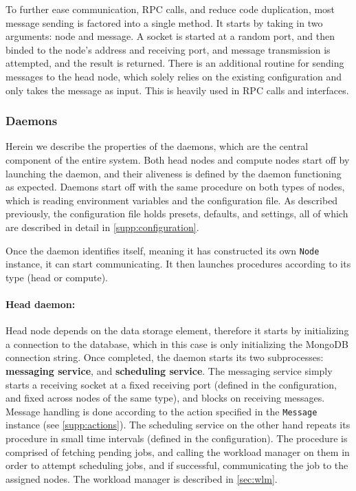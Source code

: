 \documentclass[sigconf]{acmart}
\begin{document}
To further ease communication, RPC calls, and reduce code duplication, most message sending is factored into a single method.
It starts by taking in two arguments: node and message. A socket is started at a random port, and then binded to the 
node's address and receiving port, and message transmission is attempted, and the result is returned. 
There is an additional routine for sending messages to the head node,
which solely relies on the existing configuration and only takes the message as input.
This is heavily used in RPC calls and interfaces.


\subsubsection{Daemons}
\label{sec:daemons}
Herein we describe the properties of the daemons, which are the central component of the entire system.
Both head nodes and compute nodes start off by launching the daemon, and their aliveness is defined by the daemon functioning as
expected.
Daemons start off with the same procedure on both types of nodes, which is reading environment variables and the configuration
file. As described previously, the configuration file holds presets, defaults, and settings, all of which are described in
detail in \cref{supp:configuration}.

Once the daemon identifies itself, meaning it has constructed its own \verb|Node| instance, it can start communicating.
It then launches procedures according to its type (head or compute).

\paragraph{Head daemon:}
Head node depends on the data storage element, therefore it starts by initializing a connection to the database, which in this
case is only initializing the MongoDB connection string.
Once completed, the daemon starts its two subprocesses: \textbf{messaging service}, and \textbf{scheduling service}.
The messaging service simply starts a receiving socket at a fixed receiving port (defined in the configuration, and fixed across
nodes of the same type), and blocks on receiving messages.
Message handling is done according to the action specified in the \verb|Message| instance (see \cref{supp:actions}).
The scheduling service on the other hand repeats its procedure in small time intervals (defined in the configuration). The
procedure is comprised of fetching pending jobs, and calling the workload manager on them in order to attempt scheduling jobs,
and if successful, communicating the job to the assigned nodes.
The workload manager is described in \cref{sec:wlm}.
\end{document}
